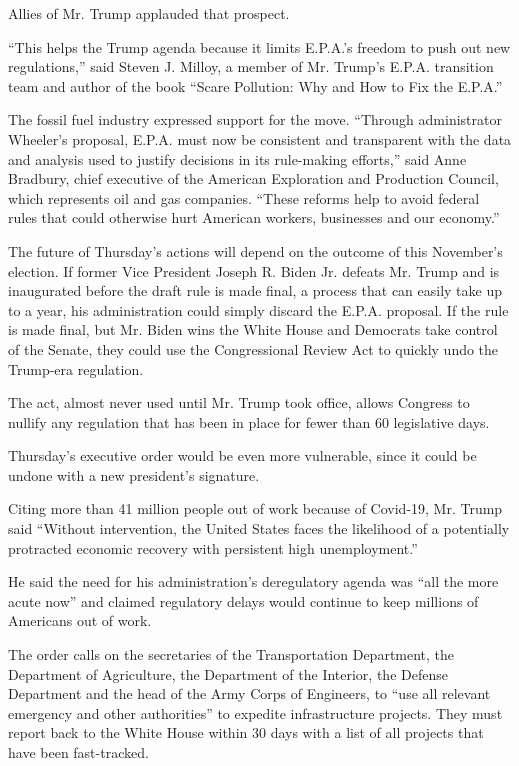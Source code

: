 Allies of Mr. Trump applauded that prospect.

``This helps the Trump agenda because it limits E.P.A.'s freedom to push
out new regulations,'' said Steven J. Milloy, a member of Mr. Trump's
E.P.A. transition team and author of the book ``Scare Pollution: Why and
How to Fix the E.P.A.''

The fossil fuel industry expressed support for the move. ``Through
administrator Wheeler's proposal, E.P.A. must now be consistent and
transparent with the data and analysis used to justify decisions in its
rule-making efforts,'' said Anne Bradbury, chief executive of the
American Exploration and Production Council, which represents oil and
gas companies. ``These reforms help to avoid federal rules that could
otherwise hurt American workers, businesses and our economy.''

The future of Thursday's actions will depend on the outcome of this
November's election. If former Vice President Joseph R. Biden Jr.
defeats Mr. Trump and is inaugurated before the draft rule is made
final, a process that can easily take up to a year, his administration
could simply discard the E.P.A. proposal. If the rule is made final, but
Mr. Biden wins the White House and Democrats take control of the Senate,
they could use the Congressional Review Act to quickly undo the
Trump-era regulation.

The act, almost never used until Mr. Trump took office, allows Congress
to nullify any regulation that has been in place for fewer than 60
legislative days.

Thursday's executive order would be even more vulnerable, since it could
be undone with a new president's signature.

Citing more than 41 million people out of work because of Covid-19, Mr.
Trump said ``Without intervention, the United States faces the
likelihood of a potentially protracted economic recovery with persistent
high unemployment.''

He said the need for his administration's deregulatory agenda was ``all
the more acute now'' and claimed regulatory delays would continue to
keep millions of Americans out of work.

The order calls on the secretaries of the Transportation Department, the
Department of Agriculture, the Department of the Interior, the Defense
Department and the head of the Army Corps of Engineers, to ``use all
relevant emergency and other authorities'' to expedite infrastructure
projects. They must report back to the White House within 30 days with a
list of all projects that have been fast-tracked.

